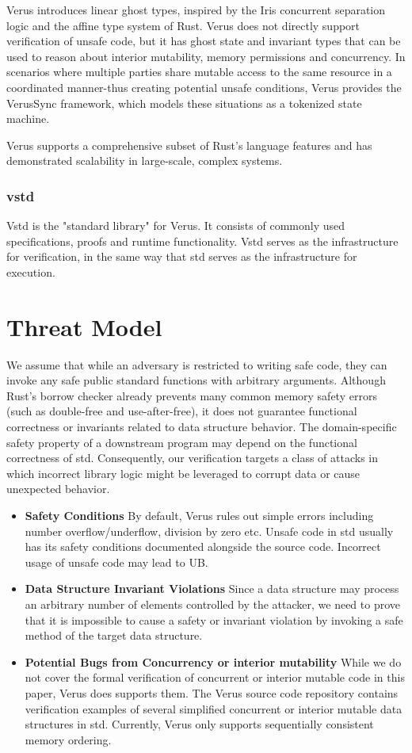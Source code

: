 \documentclass[conference]{IEEEtran}
\begin{document}
Verus introduces linear ghost types, inspired by the Iris concurrent separation logic\cite{Iris_contributors_Iris} and the affine type system of Rust. Verus does not directly support verification of unsafe code, but it has ghost state and invariant types that can be used to reason about interior mutability, memory permissions and concurrency. In scenarios where multiple parties share mutable access to the same resource in a coordinated manner-thus creating potential unsafe conditions, Verus provides the VerusSync framework, which models these situations as a tokenized state machine.    

Verus supports a comprehensive subset of Rust's language features and has demonstrated scalability in large-scale, complex systems\cite{verus_publications}.

\subsubsection{vstd}
Vstd is the "standard library" for Verus. It consists of commonly used specifications, proofs and runtime functionality. Vstd serves as the infrastructure for verification, in the same way that std serves as the infrastructure for execution.     

\section{Threat Model}
We assume that while an adversary is restricted to writing safe code, they can invoke any safe public standard functions with arbitrary arguments. Although Rust's borrow checker already prevents many common memory safety errors (such as double-free and use-after-free), it does not guarantee functional correctness or invariants related to data structure behavior. The domain-specific safety property of a downstream program may depend on the functional correctness of std. Consequently, our verification targets a class of attacks in which incorrect library logic might be leveraged to corrupt data or cause unexpected behavior.

\begin{itemize}
\item \textbf{Safety Conditions} By default, Verus rules out simple errors including number overflow/underflow, division by zero etc. Unsafe code in std usually has its safety conditions documented alongside the source code. Incorrect usage of unsafe code may lead to UB. 
\item \textbf{Data Structure Invariant Violations} Since a data structure may process an arbitrary number of elements controlled by the attacker, we need to prove that it is impossible to cause a safety or invariant violation by invoking a safe method of the target data structure.  
\item \textbf{Potential Bugs from Concurrency or interior mutability} While we do not cover the formal verification of concurrent or interior mutable code in this paper, Verus does supports them. The Verus source code repository contains verification examples of several simplified concurrent or interior mutable data structures in std. Currently, Verus only supports sequentially consistent memory ordering. 
\end{itemize}
\end{document}
